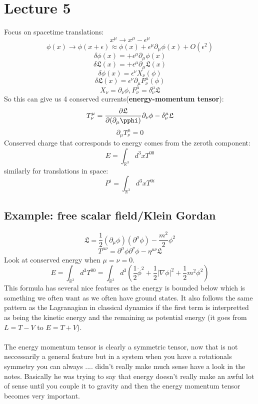 \documentclass[12pt, a4paper, twoside, titlepage]{article}
\begin{document}
\section{Lecture 5}
Focus on spacetime translations:
$$
x^{\mu} \rightarrow x^{\mu} - \epsilon^{\mu}
$$
$$
\phi(x) \rightarrow \phi(x + \epsilon) \approx \phi(x) + \epsilon^{\mu}\partial_{\mu}\phi(x) + O(\epsilon^2)
$$
$$
\delta \phi(x) = + \epsilon^{\mu} \partial_{\mu} \phi(x)
$$
$$
\delta \mathfrak{L}(x) = + \epsilon^{\mu} \partial_{\mu} \mathfrak{L}(x)
$$
$$
\delta \phi(x)  = \epsilon^{\nu}X_{\nu}(\phi)
$$
$$
\delta \mathfrak{L} (x) = \epsilon^{\nu} \partial_{\mu} F^{\mu}_{\nu}(\phi)
$$
$$
X_{\nu} = \partial_{\nu} \phi, F^{\mu}_{\nu} = \delta^{\mu}_{\nu}\mathfrak{L}
$$
So this can give us 4 conserved currents(\textbf{energy-momentum tensor}):
\begin{equation}
        T^{\mu}_{\nu} = \frac{\partial \mathfrak{L}}{\partial (\partial_{\mu}\pphi)}\partial_{\nu} \phi - \delta ^{\mu}_{\nu} \mathfrak{L}
\end{equation}
$$
\partial_{\mu}T^{\mu}_{\nu} = 0
$$
Conserved charge that corresponds to energy comes from the zeroth component:
$$
E= \int_{\mathbb{R}^3} d^3x T^{00}
$$
similarly for translations in space:
$$
 P^i = \int_{\mathbb{R}^3} d^3x T^{0i}
$$
\subsection{Example: free scalar field/Klein Gordan}
$$
\mathfrak{L} = \frac{1}{2} (\partial_{\mu}\phi)(\partial^{\mu}\phi) - \frac{m^2}{2}\phi^2
$$
$$
T^{\mu \nu} = \partial^{\mu}\phi\partial^{\nu}\phi - \eta^{\mu \nu} \mathfrak{L}
$$
Look at conserved energy when $\mu = \nu = 0$.
$$
E = \int_{\mathbb{R}^3} d^3 T^{00} = \int_{\mathbb{R}^3} d^3 (\frac{1}{2}\dot\phi^2 + \frac{1}{2} |\nabla \phi|^2 + \frac{1}{2} m^2 \phi^2)
$$
This formula has several nice features as the energy is bounded below which is something we often want as we often have ground states. It also follows the same pattern as the Lagranagian in classical dynamics if the first term is interpretted as being the kinetic energy and the remaining as potential energy (it goes from $L= T-V $ to $E= T+V$).\\\\
The energy momentum tensor is clearly a symmetric tensor, now that is not neccessarily a general feature but in a system when you have a rotationals symmetry you can always .... didn't really make much sense have a look in the notes. Basically he was trying to say that energy doesn't really make an awful lot of sense until you couple it to gravity and then the energy momentum tensor becomes very important. \\\\
\end{document}
